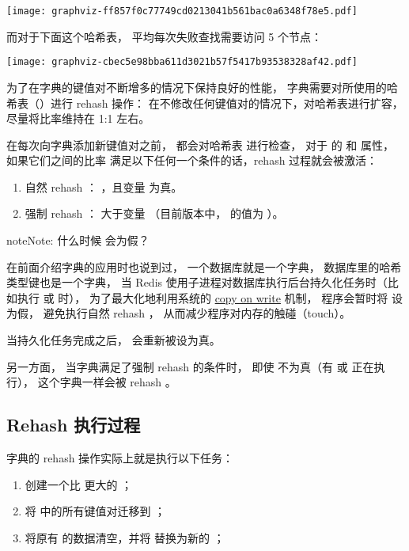 \documentclass[a4paper,11pt,english]{sphinxmanual}
\begin{document}
\texttt{[image: graphviz-ff857f0c77749cd0213041b561bac0a6348f78e5.pdf]}

而对于下面这个哈希表，
平均每次失败查找需要访问 5 个节点：

\texttt{[image: graphviz-cbec5e98bba611d3021b57f5417b93538328af42.pdf]}

为了在字典的键值对不断增多的情况下保持良好的性能，
字典需要对所使用的哈希表（）进行 rehash 操作：
在不修改任何键值对的情况下，对哈希表进行扩容，
尽量将比率维持在 1:1 左右。

 在每次向字典添加新键值对之前， 都会对哈希表  进行检查，
对于  的  和  属性，
如果它们之间的比率  满足以下任何一个条件的话，rehash 过程就会被激活：
\begin{enumerate}
\item {} 
自然 rehash ：  ，且变量  为真。

\item {} 
强制 rehash ：  大于变量  （目前版本中，  的值为  ）。

\end{enumerate}

\begin{notice}{note}{Note:}
什么时候  会为假？

在前面介绍字典的应用时也说到过，
一个数据库就是一个字典，
数据库里的哈希类型键也是一个字典，
当 Redis 使用子进程对数据库执行后台持久化任务时（比如执行  或  时），
为了最大化地利用系统的 \href{http://en.wikipedia.org/wiki/Copy-on-write}{copy on write} 机制，
程序会暂时将  设为假，
避免执行自然 rehash ，
从而减少程序对内存的触碰（touch）。

当持久化任务完成之后，
 会重新被设为真。

另一方面，
当字典满足了强制 rehash 的条件时，
即使  不为真（有  或  正在执行），
这个字典一样会被 rehash 。
\end{notice}


\subsection{Rehash 执行过程}
\label{internal-datastruct/dict:id13}
字典的 rehash 操作实际上就是执行以下任务：
\begin{enumerate}
\item {} 
创建一个比  更大的  ；

\item {} 
将  中的所有键值对迁移到  ；

\item {} 
将原有  的数据清空，并将  替换为新的  ；

\end{enumerate}
\end{document}
